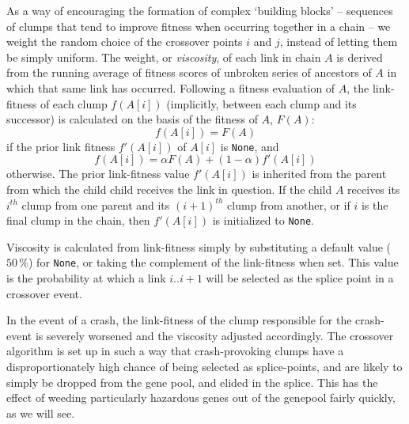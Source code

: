 As a way of encouraging the formation of complex `building
blocks' -- sequences of clumps that tend to improve fitness when
occurring together in a chain -- we weight the random choice of
the crossover points $i$ and $j$, instead of letting them be
simply uniform. The weight, or \emph{viscosity}, of each
link in chain $A$ is derived from the running average of fitness
scores of unbroken series of ancestors of $A$ in which that same link
has occurred. Following a fitness evaluation of $A$, the
link-fitness of each clump $f(A[i])$ (implicitly, between each
clump and its successor) is calculated on the basis of the
fitness of $A$, $F(A)$: 
  $$ f(A[i]) = F(A)$$
if the prior link fitness $f'(A[i])$ of $A[i]$ is \texttt{None},
and 
  $$ f(A[i]) = \alpha F(A) + (1-\alpha) f'(A[i]) $$
otherwise. The prior link-fitness value $f'(A[i])$ is inherited
from the parent from which the child child receives the link in
question. If the child $A$ receives its $i^{th}$ clump from one
parent and its $(i+1)^{th}$ clump from another, or if $i$ is the
final clump in the chain, then $f'(A[i])$ is initialized to
\texttt{None}.

Viscosity is calculated from link-fitness simply by substituting
a default value ($50\,\%$) for \texttt{None}, or taking the
complement of the link-fitness when set. This value is the probability at
which a link $i..i+1$ will be selected as the splice point in a
crossover event. 

In the event of a crash, the link-fitness of the clump
responsible for the crash-event is severely worsened
and the viscosity adjusted accordingly. The crossover algorithm
is set up in such a way that crash-provoking clumps have a
disproportionately high chance of being selected as
splice-points, and are likely to simply be dropped from the gene
pool, and elided in the splice. This has the effect of weeding
particularly hazardous genes out of the genepool fairly quickly,
as we will see. 






